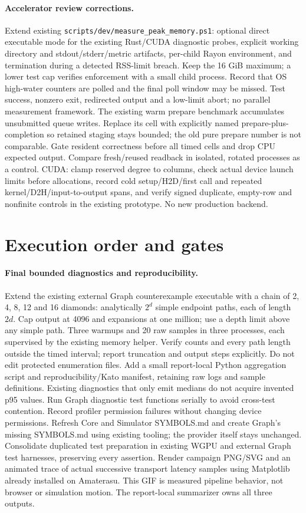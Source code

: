 \documentclass[10pt,a4paper]{article}
\begin{document}
\paragraph{Accelerator review corrections.}
Extend existing \texttt{scripts/dev/measure\_peak\_memory.ps1}: optional direct
executable mode for the existing Rust/CUDA diagnostic probes, explicit working
directory and stdout/stderr/metric artifacts, per-child Rayon environment, and
termination during a detected RSS-limit breach. Keep the 16 GiB maximum; a lower
test cap verifies enforcement with a small child process. Record that OS high-water
counters are polled and the final poll window may be missed. Test success, nonzero
exit, redirected output and a low-limit abort; no parallel measurement framework.
The existing warm prepare benchmark accumulates unsubmitted queue writes. Replace
its cell with explicitly named prepare-plus-completion so retained staging stays
bounded; the old pure prepare number is not comparable. Gate resident correctness
before all timed cells and drop CPU expected output. Compare fresh/reused readback
in isolated, rotated processes as a control. CUDA: clamp reserved degree to columns,
check actual device launch limits before allocations, record cold setup/H2D/first
call and repeated kernel/D2H/input-to-output spans, and verify signed duplicate,
empty-row and nonfinite controls in the existing prototype. No new production backend.
\section{Execution order and gates}
\paragraph{Final bounded diagnostics and reproducibility.}
Extend the existing external Graph counterexample executable with a chain of
2, 4, 8, 12 and 16 diamonds: analytically $2^d$ simple endpoint paths, each
of length $2d$. Cap output at 4096 and expansions at one million; use a depth
limit above any simple path. Three warmups and 20 raw samples in three processes,
each supervised by the existing memory helper. Verify counts and every path
length outside the timed interval; report truncation and output steps explicitly.
Do not edit protected enumeration files. Add a small report-local Python
aggregation script and reproducibility/Kato manifest, retaining raw logs and
sample definitions. Existing diagnostics that only emit medians do not acquire
invented p95 values. Run Graph diagnostic test functions serially to avoid
cross-test contention. Record profiler permission failures without changing
device permissions. Refresh Core and Simulator SYMBOLS.md and create Graph's
missing SYMBOLS.md using existing tooling; the provider itself stays unchanged.
Consolidate duplicated test preparation in existing WGPU and external Graph test
harnesses, preserving every assertion. Render campaign PNG/SVG and an animated
trace of actual successive transport latency samples using Matplotlib already
installed on Amaterasu. This GIF is measured pipeline behavior, not browser or
simulation motion. The report-local summarizer owns all three outputs.
\end{document}
